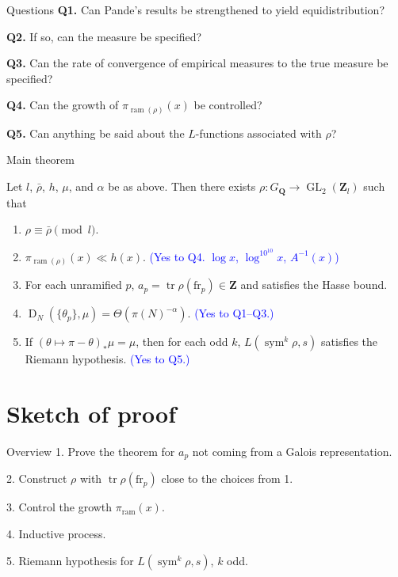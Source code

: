 \documentclass{beamer}
\DeclareMathOperator{\D}{D}
\DeclareMathOperator{\GL}{GL}
\DeclareMathOperator{\ram}{ram}
\DeclareMathOperator{\sym}{sym}
\DeclareMathOperator{\tr}{tr}
\newcommand{\bQ}{\mathbf{Q}}
\newcommand{\bZ}{\mathbf{Z}}
\newcommand{\frob}{\mathrm{fr}}
\begin{document}
\begin{frame}{Questions}
\textbf{Q1.} Can Pande's results be strengthened to yield equidistribution? 

\textbf{Q2.} If so, can the measure be specified?

\textbf{Q3.} Can the rate of convergence of empirical measures to the true measure 
be specified?

\textbf{Q4.} Can the growth of $\pi_{\ram(\rho)}(x)$ be controlled?

\textbf{Q5.} Can anything be said about the $L$-functions associated with $\rho$?
\end{frame}



\begin{frame}{Main theorem}
\begin{theorem}[M.]
Let $l$, $\bar\rho$, $h$, $\mu$, and $\alpha$ be as above. Then there exists 
$\rho\colon G_\bQ \to \GL_2(\bZ_l)$ such that 
\pause
\begin{enumerate}
\item
$\rho \equiv \bar\rho\pmod{l}$. 
\pause

\item
$\pi_{\ram(\rho)}(x) \ll h(x)$. 
\pause
\textcolor{blue}{(Yes to Q4. 
\pause
$\log x$, 
\pause
$\log^{10^{10}}x$, 
\pause
$A^{-1}(x)$)}
\pause

\item
For each unramified $p$, $a_p = \tr \rho(\frob_p)\in \bZ$ and satisfies the 
Hasse bound.
\pause

\item
$\D_N(\{\theta_p\},\mu) = \Theta(\pi(N)^{-\alpha})$. 
\pause
\textcolor{blue}{(Yes to Q1--Q3.)}
\pause

\item
If $(\theta\mapsto \pi-\theta)_\ast \mu = \mu$, then for each odd $k$, 
$L(\sym^k \rho,s)$ satisfies the Riemann hypothesis. 
\pause
\textcolor{blue}{(Yes to Q5.)}
\end{enumerate}
\end{theorem}
\end{frame}






\section{Sketch of proof}

\begin{frame}{Overview}
1. Prove the theorem for $a_p$ not coming from a Galois representation. 
\pause

2. Construct $\rho$ with $\tr\rho(\frob_p)$ close to the choices from 1. 
\pause

3. Control the growth $\pi_{\ram}(x)$. 
\pause

4. Inductive process.
\pause

5. Riemann hypothesis for $L(\sym^k\rho,s)$, $k$ odd.
\end{frame}
\end{document}
